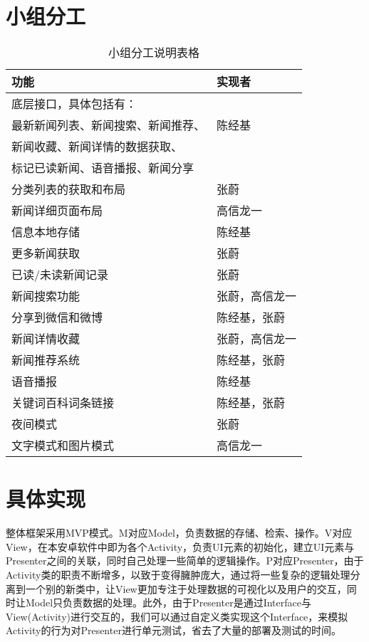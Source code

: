 \documentclass[UTF8]{ctexart}
\begin{document}
\section{小组分工}
\begin{table*}[!htb]
\centering
\caption{小组分工说明表格}
\label{work distribution}
\begin{tabular}{ll}
\toprule
功能 &实现者\\
\midrule
底层接口，具体包括有： &\\
最新新闻列表、新闻搜索、新闻推荐、&陈经基 \\
新闻收藏、新闻详情的数据获取、& \\
标记已读新闻、语音播报、新闻分享 & \\
\midrule
分类列表的获取和布局 &张蔚\\
新闻详细页面布局 &高信龙一\\
信息本地存储 &陈经基\\
更多新闻获取 &张蔚\\
已读/未读新闻记录 &张蔚\\
新闻搜索功能 &张蔚，高信龙一\\
分享到微信和微博 &陈经基，张蔚\\
新闻详情收藏 &张蔚，高信龙一\\
\midrule
新闻推荐系统 &陈经基，张蔚\\
语音播报 &陈经基\\
关键词百科词条链接 &陈经基，张蔚\\
夜间模式 &张蔚\\
文字模式和图片模式 &高信龙一\\
\bottomrule
\end{tabular}
\end{table*}

\newpage
\section{具体实现}
整体框架采用MVP模式。M对应Model，负责数据的存储、检索、操作。V对应View，在本安卓软件中即为各个Activity，负责UI元素的初始化，建立UI元素与Presenter之间的关联，同时自己处理一些简单的逻辑操作。P对应Presenter，由于Activity类的职责不断增多，以致于变得臃肿庞大，通过将一些复杂的逻辑处理分离到一个别的新类中，让View更加专注于处理数据的可视化以及用户的交互，同时让Model只负责数据的处理。此外，由于Presenter是通过Interface与View(Activity)进行交互的，我们可以通过自定义类实现这个Interface，来模拟Activity的行为对Presenter进行单元测试，省去了大量的部署及测试的时间。
\end{document}
